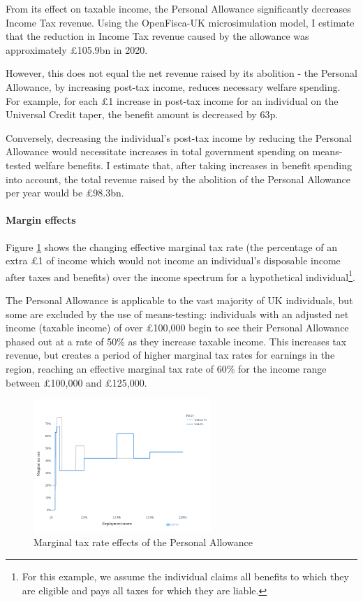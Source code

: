\documentclass{article}
\begin{document}
    From its effect on taxable income, the Personal Allowance significantly decreases Income Tax revenue. Using the OpenFisca-UK microsimulation model, I estimate that the reduction in Income Tax revenue caused by the allowance was approximately £105.9bn in 2020. 
    
    However, this does not equal the net revenue raised by its abolition - the Personal Allowance, by increasing post-tax income, reduces necessary welfare spending. For example, for each £1 increase in post-tax income for an individual on the Universal Credit taper, the benefit amount is decreased by 63p. 
    
    Conversely, decreasing the individual's post-tax income by reducing the Personal Allowance would necessitate increases in total government spending on means-tested welfare benefits. I estimate that, after taking increases in benefit spending into account, the total revenue raised by the abolition of the Personal Allowance per year would be £98.3bn.
    
    \paragraph{Margin effects} Figure \ref{fig:PA_mtr_effects} shows the changing effective marginal tax rate (the percentage of an extra £1 of income which would not income an individual's disposable income after taxes and benefits) over the income spectrum for a hypothetical individual\footnote{For this example, we assume the individual claims all benefits to which they are eligible and pays all taxes for which they are liable.}. 
    
    The Personal Allowance is applicable to the vast majority of UK individuals, but some are excluded by the use of means-testing: individuals with an adjusted net income (taxable income) of over £100,000 begin to see their Personal Allowance phased out at a rate of 50\% as they increase taxable income. This increases tax revenue, but creates a period of higher marginal tax rates for earnings in the region, reaching an effective marginal tax rate of 60\% for the income range between £100,000 and £125,000.

    \begin{figure}
        \centering
        \includegraphics[width=0.6\textwidth]{images/fig_2.png}
        \caption{Marginal tax rate effects of the Personal Allowance}
        \label{fig:PA_mtr_effects}
    \end{figure}
    
\end{document}
